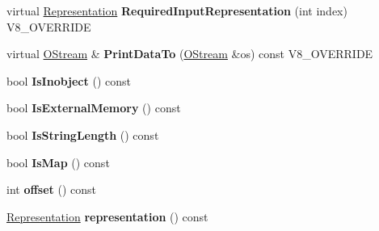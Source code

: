 \begin{DoxyCompactItemize}
\item 
\hypertarget{classv8_1_1internal_1_1_v8___f_i_n_a_l_a6c6d1f37f40b113d8f4062f1ffff7215}{}virtual \hyperlink{classv8_1_1internal_1_1_representation}{Representation} {\bfseries Required\+Input\+Representation} (int index) V8\+\_\+\+O\+V\+E\+R\+R\+I\+D\+E\label{classv8_1_1internal_1_1_v8___f_i_n_a_l_a6c6d1f37f40b113d8f4062f1ffff7215}

\item 
\hypertarget{classv8_1_1internal_1_1_v8___f_i_n_a_l_ac450dad970b14246be761ccf5004924b}{}virtual \hyperlink{classv8_1_1internal_1_1_o_stream}{O\+Stream} \& {\bfseries Print\+Data\+To} (\hyperlink{classv8_1_1internal_1_1_o_stream}{O\+Stream} \&os) const V8\+\_\+\+O\+V\+E\+R\+R\+I\+D\+E\label{classv8_1_1internal_1_1_v8___f_i_n_a_l_ac450dad970b14246be761ccf5004924b}

\item 
\hypertarget{classv8_1_1internal_1_1_v8___f_i_n_a_l_a9adb8a8824b102c9d638fd593c0165ba}{}bool {\bfseries Is\+Inobject} () const \label{classv8_1_1internal_1_1_v8___f_i_n_a_l_a9adb8a8824b102c9d638fd593c0165ba}

\item 
\hypertarget{classv8_1_1internal_1_1_v8___f_i_n_a_l_a3cd5295f738a6ef9b0ab554a2cc91b12}{}bool {\bfseries Is\+External\+Memory} () const \label{classv8_1_1internal_1_1_v8___f_i_n_a_l_a3cd5295f738a6ef9b0ab554a2cc91b12}

\item 
\hypertarget{classv8_1_1internal_1_1_v8___f_i_n_a_l_ae9f409933c825920c376b03333e84d2c}{}bool {\bfseries Is\+String\+Length} () const \label{classv8_1_1internal_1_1_v8___f_i_n_a_l_ae9f409933c825920c376b03333e84d2c}

\item 
\hypertarget{classv8_1_1internal_1_1_v8___f_i_n_a_l_a7cba7d2b3e89bbdc03f568655d659da6}{}bool {\bfseries Is\+Map} () const \label{classv8_1_1internal_1_1_v8___f_i_n_a_l_a7cba7d2b3e89bbdc03f568655d659da6}

\item 
\hypertarget{classv8_1_1internal_1_1_v8___f_i_n_a_l_ac9d88f76bbd8a11f5cd8ecf5b0cb1844}{}int {\bfseries offset} () const \label{classv8_1_1internal_1_1_v8___f_i_n_a_l_ac9d88f76bbd8a11f5cd8ecf5b0cb1844}

\item 
\hypertarget{classv8_1_1internal_1_1_v8___f_i_n_a_l_a4ad098917cb3d8529db5772039213548}{}\hyperlink{classv8_1_1internal_1_1_representation}{Representation} {\bfseries representation} () const \label{classv8_1_1internal_1_1_v8___f_i_n_a_l_a4ad098917cb3d8529db5772039213548}


\end{DoxyCompactItemize}
